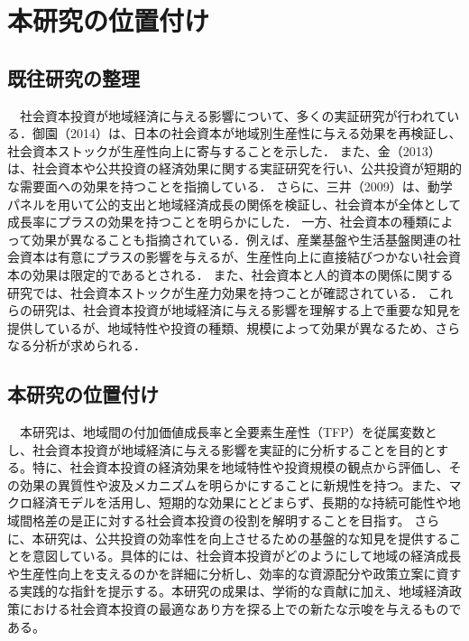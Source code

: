 \chapter{本研究の位置付け}

\section{既往研究の整理}
　社会資本投資が地域経済に与える影響について、多くの実証研究が行われている．御園（2014）\cite{misono2014}は、日本の社会資本が地域別生産性に与える効果を再検証し、社会資本ストックが生産性向上に寄与することを示した． また、金（2013）\cite{kim2013}は、社会資本や公共投資の経済効果に関する実証研究を行い、公共投資が短期的な需要面への効果を持つことを指摘している． さらに、三井（2009）\cite{mitsui2009}は、動学パネルを用いて公的支出と地域経済成長の関係を検証し、社会資本が全体として成長率にプラスの効果を持つことを明らかにした． 一方、社会資本の種類によって効果が異なることも指摘されている．例えば、産業基盤や生活基盤関連の社会資本は有意にプラスの影響を与えるが、生産性向上に直接結びつかない社会資本の効果は限定的であるとされる\cite{mitsui2010}． また、社会資本と人的資本の関係に関する研究では、社会資本ストックが生産力効果を持つことが確認されている\cite{yamano2007}． これらの研究は、社会資本投資が地域経済に与える影響を理解する上で重要な知見を提供しているが、地域特性や投資の種類、規模によって効果が異なるため、さらなる分析が求められる．
 
\section{本研究の位置付け}
　本研究は、地域間の付加価値成長率と全要素生産性（TFP）を従属変数とし、社会資本投資が地域経済に与える影響を実証的に分析することを目的とする。特に、社会資本投資の経済効果を地域特性や投資規模の観点から評価し、その効果の異質性や波及メカニズムを明らかにすることに新規性を持つ。また、マクロ経済モデルを活用し、短期的な効果にとどまらず、長期的な持続可能性や地域間格差の是正に対する社会資本投資の役割を解明することを目指す。
さらに、本研究は、公共投資の効率性を向上させるための基盤的な知見を提供することを意図している。具体的には、社会資本投資がどのようにして地域の経済成長や生産性向上を支えるのかを詳細に分析し、効率的な資源配分や政策立案に資する実践的な指針を提示する。本研究の成果は、学術的な貢献に加え、地域経済政策における社会資本投資の最適なあり方を探る上での新たな示唆を与えるものである。
